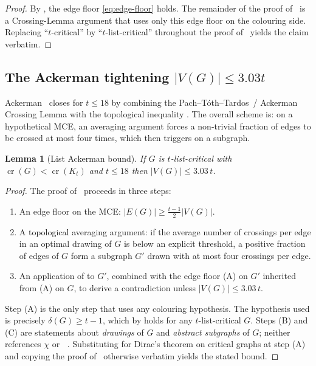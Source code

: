 \documentclass[11pt,a4paper]{article}
\newtheorem{lemma}[theorem]{Lemma}
\theoremstyle{definition}
\DeclareMathOperator{\crN}{cr}
\DeclareMathOperator{\chl}{\chi_{\ell}}
\begin{document}
\begin{proof}
By , the edge floor
\eqref{eq:edge-floor} holds. The remainder of the proof
of~\cite[Theorem~1.2]{BT} is a Crossing-Lemma argument that uses
only this edge floor on the colouring side. Replacing
``$t$-critical'' by ``$t$-list-critical'' throughout the proof
of~\cite[Theorem~1.2]{BT} yields the claim verbatim.
\end{proof}

\subsection{The Ackerman tightening $|V(G)| \le 3.03t$}

Ackerman~\cite{Ackerman} closes  for
$t \le 18$ by combining the Pach--T\'oth--Tardos~/ Ackerman
Crossing Lemma with the topological inequality
. The overall scheme is: on a hypothetical
MCE, an averaging argument forces a non-trivial fraction of edges
to be crossed at most four times, which then triggers
 on a subgraph.

\begin{lemma}[List Ackerman bound]\label{lem:list-ackerman}
If $G$ is $t$-list-critical with $\crN(G) < \crN(K_t)$ and
$t \le 18$ then $|V(G)| \le 3.03\,t$.
\end{lemma}

\begin{proof}
The proof of~\cite[Theorem~1]{Ackerman} proceeds in three steps:

\begin{enumerate}
\item[(A)] An edge floor on the MCE:
$|E(G)| \ge \tfrac{t-1}{2}|V(G)|$.
\item[(B)] A topological averaging argument: if the average number
  of crossings per edge in an optimal drawing of $G$ is below an
  explicit threshold, a positive fraction of edges of $G$ form a
  subgraph $G'$ drawn with at most four crossings per edge.
\item[(C)] An application of  to $G'$,
  combined with the edge floor (A) on $G'$ inherited from (A) on
  $G$, to derive a contradiction unless $|V(G)| \le 3.03\,t$.
\end{enumerate}

Step (A) is the only step that uses any colouring hypothesis. The
hypothesis used is precisely $\delta(G) \ge t - 1$, which by
 holds for any $t$-list-critical $G$.
Steps (B) and (C) are statements about \emph{drawings} of $G$ and
\emph{abstract subgraphs} of $G$; neither references $\chi$ or
$\chl$. Substituting  for Dirac's theorem on
critical graphs at step (A) and copying the proof
of~\cite[Theorem~1]{Ackerman} otherwise verbatim yields the
stated bound.
\end{proof}
\end{document}
